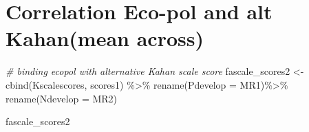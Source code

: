 \documentclass[
]{article}
\newenvironment{Shaded}{\begin{snugshade}}{\end{snugshade}}
\newcommand{\AttributeTok}[1]{\textcolor[rgb]{0.77,0.63,0.00}{#1}}
\newcommand{\CommentTok}[1]{\textcolor[rgb]{0.56,0.35,0.01}{\textit{#1}}}
\newcommand{\FunctionTok}[1]{\textcolor[rgb]{0.00,0.00,0.00}{#1}}
\newcommand{\NormalTok}[1]{#1}
\newcommand{\OtherTok}[1]{\textcolor[rgb]{0.56,0.35,0.01}{#1}}
\newcommand{\SpecialCharTok}[1]{\textcolor[rgb]{0.00,0.00,0.00}{#1}}
\begin{document}
\hypertarget{correlation-eco-pol-and-alt-kahanmean-across}{%
\section{Correlation Eco-pol and alt Kahan(mean
across)}\label{correlation-eco-pol-and-alt-kahanmean-across}}

\begin{Shaded}
\begin{Highlighting}[]
\CommentTok{\# binding ecopol with alternative Kahan scale score }
\NormalTok{fascale\_scores2 }\OtherTok{\textless{}{-}}\FunctionTok{cbind}\NormalTok{(Kscalescores, scores1)  }\SpecialCharTok{\%\textgreater{}\%}
  \FunctionTok{rename}\NormalTok{(}\AttributeTok{Pdevelop =}\NormalTok{ MR1)}\SpecialCharTok{\%\textgreater{}\%}
  \FunctionTok{rename}\NormalTok{(}\AttributeTok{Ndevelop =}\NormalTok{ MR2)}

\NormalTok{fascale\_scores2}
\end{Highlighting}
\end{Shaded}
\end{document}
